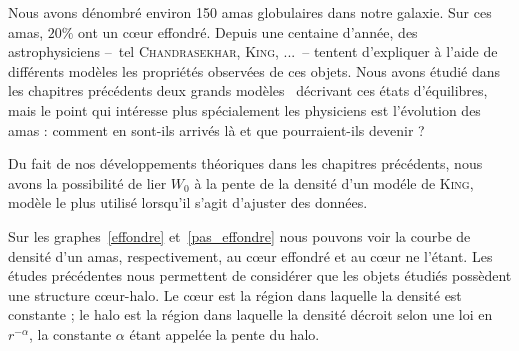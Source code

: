 	Nous avons dénombré environ 150 amas globulaires dans notre galaxie. Sur ces amas, $20\%$ ont un cœur effondré. %
	Depuis une centaine d'année, des astrophysiciens --~tel \textsc{Chandrasekhar}, \textsc{King}, ...~--
	tentent d'expliquer à l'aide de différents modèles les propriétés observées de ces objets.
	Nous avons étudié dans les chapitres précédents deux \og grands modèles \fg~décrivant ces états d'équilibres,
	mais le point qui intéresse plus spécialement les physiciens est l'évolution des amas : comment en sont-ils
	arrivés là et que pourraient-ils devenir ?

	Du fait de nos développements théoriques dans les chapitres précédents, nous avons la possibilité de lier
	$W_0$ à la pente de la densité d'un modéle de \textsc{King},  modèle le plus utilisé lorsqu'il s'agit d'ajuster des données.

	Sur les graphes~\ref{effondre} et~\ref{pas_effondre} nous pouvons voir la courbe de densité
	d'un amas, respectivement, au cœur effondré et au cœur ne l'étant.
	Les études précédentes nous permettent de considérer que les objets étudiés possèdent une structure cœur-halo. Le cœur est la région dans laquelle la densité est constante ; le halo est la région dans laquelle la densité
	décroit selon une loi en $r^{-\alpha}$, la constante $\alpha$ étant appelée la pente du halo.

